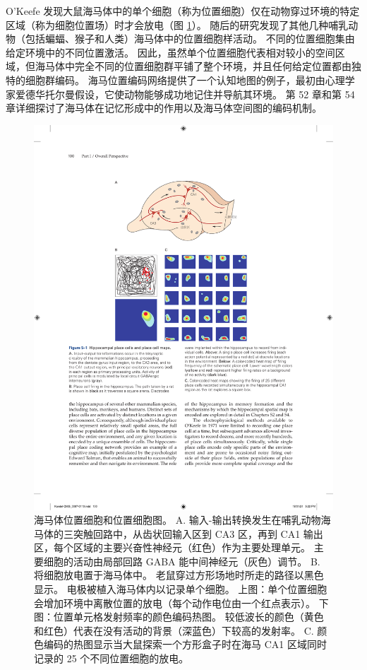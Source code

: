 O’Keefe 发现大鼠海马体中的单个细胞（称为位置细胞）仅在动物穿过环境的特定区域（称为细胞位置场）时才会放电（图 \ref{fig:5_1}）。 
随后的研究发现了其他几种哺乳动物（包括蝙蝠、猴子和人类）海马体中的位置细胞样活动。 不同的位置细胞集由给定环境中的不同位置激活。 因此，虽然单个位置细胞代表相对较小的空间区域，但海马体中完全不同的位置细胞群平铺了整个环境，并且任何给定位置都由独特的细胞群编码。 海马位置编码网络提供了一个认知地图的例子，最初由心理学家爱德华托尔曼假设，它使动物能够成功地记住并导航其环境。 第 52 章和第 54 章详细探讨了海马体在记忆形成中的作用以及海马体空间图的编码机制。

\begin{figure}[htbp]
	\centering
	\includegraphics[width=1.0\linewidth]{chap05/fig_5_1}
	\caption{海马体位置细胞和位置细胞图。 
		A. 输入-输出转换发生在哺乳动物海马体的三突触回路中，从齿状回输入区到 CA3 区，再到 CA1 输出区，每个区域的主要兴奋性神经元（红色）作为主要处理单元。
		主要细胞的活动由局部回路 GABA 能中间神经元（灰色）调节。 
		B. 将细胞放电置于海马体中。 
		老鼠穿过方形场地时所走的路径以黑色显示。 
		电极被植入海马体内以记录单个细胞。 
		上图：单个位置细胞会增加环境中离散位置的放电（每个动作电位由一个红点表示）。
		下图：位置单元格发射频率的颜色编码热图。 
		较低波长的颜色（黄色和红色）代表在没有活动的背景（深蓝色）下较高的发射率。 
		C. 颜色编码的热图显示当大鼠探索一个方形盒子时在海马 CA1 区域同时记录的 25 个不同位置细胞的放电。}
	\label{fig:5_1}
\end{figure}


